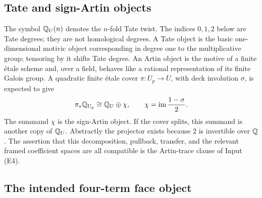 \subsection{Tate and sign-Artin objects}

The symbol \(\mathbb Q_U(n)\) denotes the \(n\)-fold Tate twist.  The indices
\(0,1,2\) below are Tate degrees; they are not homological degrees.  A
Tate object is the basic one-dimensional motivic object corresponding in
degree one to the multiplicative group; tensoring by it shifts Tate degree.
An Artin object is the motive of a finite \'{e}tale scheme and, over a field,
behaves like a rational representation of its finite Galois group.  A
quadratic finite \'{e}tale cover \(\pi:U_p\to U\), with deck involution
\(\sigma\), is expected to give
\begin{equation}
 \pi_*\mathbb Q_{U_p}\cong\mathbb Q_U\oplus\chi,
 \qquad
 \chi=\operatorname{im}\frac{1-\sigma}{2}.
 \label{cp:eq-sign-motive}
\end{equation}
The summand \(\chi\) is the sign-Artin object.  If the cover splits, this
summand is another copy of \(\mathbb Q_U\).  Abstractly the projector exists
because \(2\) is invertible over \(\mathbb Q\).  The assertion that this
decomposition, pullback, transfer, and the relevant framed coefficient
spaces are all compatible is the Artin-trace clause of Input
\textup{(E4)}.

\subsection{The intended four-term face object}
\label{cp:subsec-face-complex}

